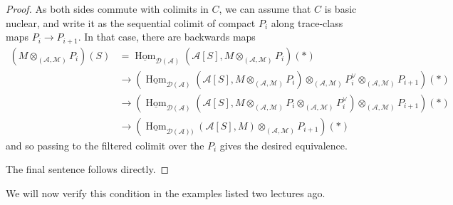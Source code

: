 \documentclass[11pt]{amsbook}
\DeclareMathOperator{\Hom}{Hom}
\newcommand{\intHom}{\underline{\Hom}}
\numberwithin{equation}{section}
\numberwithin{theorem}{section}
\theoremstyle{definition}
\begin{document}
\begin{proof} As both sides commute with colimits in $C$, we can assume that $C$ is basic nuclear, and write it as the sequential colimit of compact $P_i$ along trace-class maps $P_i\to P_{i+1}$. In that case, there are backwards maps
\[\begin{aligned}
(M\otimes_{(\mathcal A,\mathcal M)} P_i)(S)&=\intHom_{\mathcal D(\mathcal A)}(\mathcal A[S],M\otimes_{(\mathcal A,\mathcal M)} P_i)(\ast)\\
&\to (\intHom_{\mathcal D(\mathcal A)}(\mathcal A[S],M\otimes_{(\mathcal A,\mathcal M)} P_i)\otimes_{(\mathcal A,\mathcal M)} P_i^\vee\otimes_{(\mathcal A,\mathcal M)} P_{i+1})(\ast)\\
&\to (\intHom_{\mathcal D(\mathcal A)}(\mathcal A[S],M\otimes_{(\mathcal A,\mathcal M)} P_i\otimes_{(\mathcal A,\mathcal M)} P_i^\vee)\otimes_{(\mathcal A,\mathcal M)} P_{i+1})(\ast)\\
&\to (\intHom_{\mathcal D(\mathcal A))}(\mathcal A[S],M)\otimes_{(\mathcal A,\mathcal M)} P_{i+1})(\ast)
\end{aligned}
\]
and so passing to the filtered colimit over the $P_i$ gives the desired equivalence.

The final sentence follows directly.
\end{proof}

We will now verify this condition in the examples listed two lectures ago.
\end{document}

